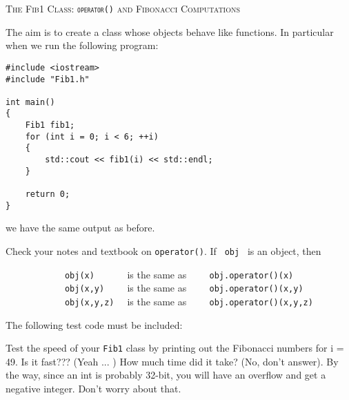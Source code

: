 \textsc{The Fib1 Class: \textnormal{\texttt{operator()}} and Fibonacci
Computations}

The aim is to create a class whose objects behave like functions. In particular when we run the
following program:

\begin{Verbatim}[frame=single]
#include <iostream>
#include "Fib1.h"

int main()
{
    Fib1 fib1;
    for (int i = 0; i < 6; ++i)
    {
        std::cout << fib1(i) << std::endl;
    }

    return 0;
}
\end{Verbatim}
we have the same output as before.

Check your notes and textbook on \verb!operator()!. If \verb! obj ! is an
object, then

\verb!            obj(x)      ! is the same as \verb!    obj.operator()(x)!
\\
\verb!            obj(x,y)    ! is the same as \verb!    obj.operator()(x,y)!
\\
\verb!            obj(x,y,z)  ! is the same as \verb!    obj.operator()(x,y,z)!


The following test code must be included:


Test the speed of your \texttt{Fib1} class by printing out the Fibonacci numbers for i = 49. Is it fast???
(Yeah ... ) How much time did it take? (No, don't answer). By the way, since an int is probably 32-bit,
you will have an overflow and get a negative integer. Don't worry about that.


